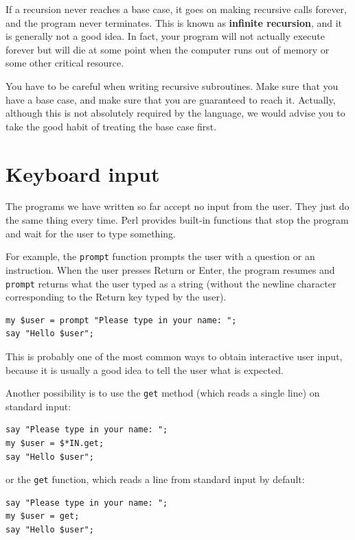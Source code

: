 If a recursion never reaches a base case, it goes on making
recursive calls forever, and the program never terminates.  This is
known as {\bf infinite recursion}, and it is generally not
a good idea. In fact, your program will not actually execute 
forever but will die at some point when the computer runs out of 
memory or some other critical resource.

You have to be careful when writing recursive subroutines. 
Make sure that you have a base case, and make sure that 
you are guaranteed to reach it. Actually, although this is not 
absolutely required by the language, we would advise you to 
take the good habit of treating the base case first.


\section{Keyboard input}

The programs we have written so far accept no input from the user. They just do the same thing every time. Perl provides built-in functions that stop the program and
wait for the user to type something. 

For example, the {\tt prompt} function prompts the user with 
a question or an instruction. When the user presses 
{\sf Return} or {\sf Enter}, the program resumes and 
\verb"prompt" returns what the user typed as a string 
(without the newline character corresponding to the 
{\sf Return} key typed by the user).

\begin{verbatim}
my $user = prompt "Please type in your name: ";
say "Hello $user";
\end{verbatim}
%

This is probably one of the most common ways to obtain 
interactive user input, because it is usually a good idea 
to tell the user what is expected.

Another possibility is to use the {\tt get} method (which reads a single line) on standard input:

\begin{verbatim}
say "Please type in your name: ";
my $user = $*IN.get;
say "Hello $user";
\end{verbatim}
%
or the {\tt get} function, which reads a line from standard input by default:
\begin{verbatim}
say "Please type in your name: ";
my $user = get;
say "Hello $user";
\end{verbatim}
%

